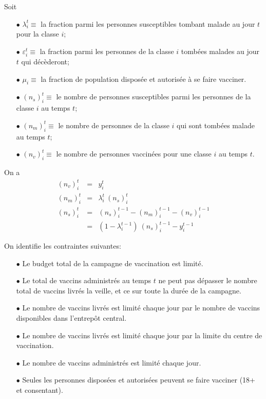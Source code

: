 \documentclass[a4paper,11pt]{report}
\begin{document}
Soit 
\begin{itemize}
\item[$\bullet$]  $\lambda_i^t \equiv$ la fraction parmi les personnes susceptibles tombant malade au jour $t$ pour la classe $i$;
\item[$\bullet$] $\varepsilon_i^t \equiv$ la fraction parmi les personnes de la classe $i$ tombées malades au jour $t$ qui décèderont;
\item[$\bullet$] $\mu_i \equiv$ la fraction de population disposée et autorisée à se faire vacciner.
\end{itemize}

\begin{itemize}
\item[$\bullet$]   $(n_s)_i^t \equiv$ le nombre de personnes susceptibles parmi les personnes de la classe $i$ au temps $t$;
\item[$\bullet$]  $(n_m)_i^t \equiv$ le nombre de personnes de la classe $i$ qui sont tombées malade au temps $t$;
\item[$\bullet$]  $(n_v)_i^t \equiv$ le nombre de personnes vaccinées pour une classe $i$ au temps $t$.
\end{itemize}

On a 
\begin{eqnarray*}
(n_v)_i^t   &=& y_i^t \\
(n_m)_i^t &=& \lambda_i^t\ (n_s)_i^t \\
(n_s)_i^t  &=& (n_s)_i^{t-1} - (n_m)_i^{t-1} - (n_v)_i^{t-1} \\
                  &=& (1-\lambda_i^{t-1})\ (n_s)_i^{t-1} - y_i^{t-1}
\end{eqnarray*}


On identifie les contraintes suivantes:
\begin{itemize}
\item[$\bullet$] Le budget total de la campagne de vaccination est limité.
\item[$\bullet$] Le total de vaccins administrés au temps $t$ ne peut pas dépasser le nombre total de vaccins livrés la veille, et ce sur toute la durée de la campagne.
\item[$\bullet$] Le nombre de vaccins livrés est limité chaque jour par le nombre de vaccins disponibles dans l'entrepôt central.
\item[$\bullet$] Le nombre de vaccins livrés est limité chaque jour par la limite du centre de vaccination.
\item[$\bullet$] Le nombre de vaccins administrés est limité chaque jour.
\item[$\bullet$]  Seules les personnes disposées et autorisées peuvent se faire vacciner (18+ et consentant). 
\end{itemize}
\end{document}
